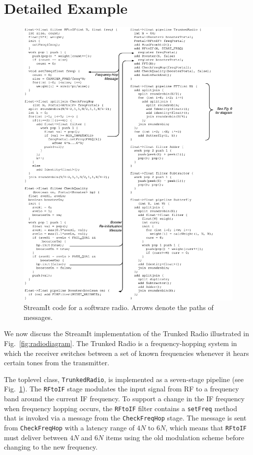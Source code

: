 \section{Detailed Example}
\label{sec:example}

\begin{figure}
\includegraphics[width=\textwidth]{code-fm.eps}
\caption{StreamIt code for a software radio.  Arrows denote the paths
  of messages.}
\label{fig:radiocode}
\end{figure}

We now discuss the StreamIt implementation of the Trunked Radio
illustrated in Fig.~\ref{fig:radiodiagram}.  The Trunked Radio is a
frequency-hopping system in which the receiver switches between a set of
known frequencies whenever it hears certain tones from the transmitter.

The toplevel class, \texttt{TrunkedRadio}, is implemented as a
seven-stage pipeline (see Fig.~\ref{fig:radiocode}).  The
\texttt{RFtoIF} stage modulates the input signal from RF to a
frequency band around the current IF frequency.  To support a change
in the IF frequency when frequency hopping occurs, the \texttt{RFtoIF}
filter contains a \texttt{setFreq} method that is invoked via a
message from the \texttt{CheckFreqHop} stage.  The message is sent
from \texttt{CheckFreqHop} with a latency range of $4N$ to $6N$, which
means that \texttt{RFtoIF} must deliver between $4N$ and $6N$ items
using the old modulation scheme before changing to the new frequency.

